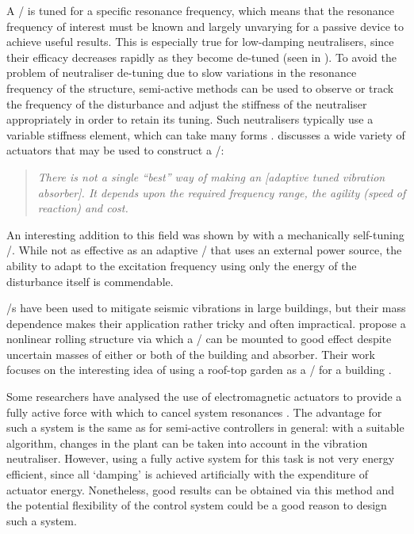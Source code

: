 \documentclass[11pt,a4paper]{memoir}
\begin{document}
A \vibneut/ is tuned for a specific resonance frequency, which means that the resonance frequency of interest must be known and largely unvarying for a passive device to achieve useful results.
This is especially true for low-damping neutralisers, since their efficacy decreases rapidly as they become de-tuned (seen in ).
To avoid the problem of neutraliser de-tuning due to slow variations in the resonance frequency of the structure, semi-active methods can be used to observe or track the frequency of the disturbance and adjust the stiffness of the neutraliser appropriately in order to retain its tuning.
Such neutralisers typically use a variable stiffness element, which can take many forms \cite{ting-kong1999,kidner2002,holdhusen2007}.
\textcite{brennan2006} discusses a wide variety of actuators that may be used to construct a \vibneut/:
\begin{quote}\itshape
There is not a single ``best'' way of making an \textup[adaptive tuned vibration absorber\textup].
It depends upon the required frequency range, the agility (speed of reaction) and cost.
\end{quote}
An interesting addition to this field was shown by
\textcite{ivers2008} with a mechanically self-tuning \vibneut/.
While not as effective as an adaptive \vibneut/ that uses an external power source, the ability to adapt to the excitation frequency using only the energy of the disturbance itself is commendable.

\Vibneut/s have been used to mitigate seismic vibrations in large buildings, but their mass dependence makes their application rather tricky and often impractical.
\textcite{matta2008} propose a nonlinear rolling structure via which a \vibneut/ can be mounted to good effect despite uncertain masses of either or both of the building and absorber.
Their work focuses on the interesting idea of using a roof-top garden as a \vibneut/ for a building \cite{matta2008a}.

Some researchers have analysed the use of electromagnetic actuators to provide a fully active force with which to cancel system resonances \cite{chen2005a,wu2007,kim2008-iecst}.
The advantage for such a system is the same as for semi-active controllers in general: with a suitable algorithm, changes in the plant can be taken into account in the vibration neutraliser.
However, using a fully active system for this task is not very energy efficient, since all `damping' is achieved artificially with the expenditure of actuator energy.
Nonetheless, good results can be obtained via this method and the potential flexibility of the control system could be a good reason to design such a system.
\end{document}
